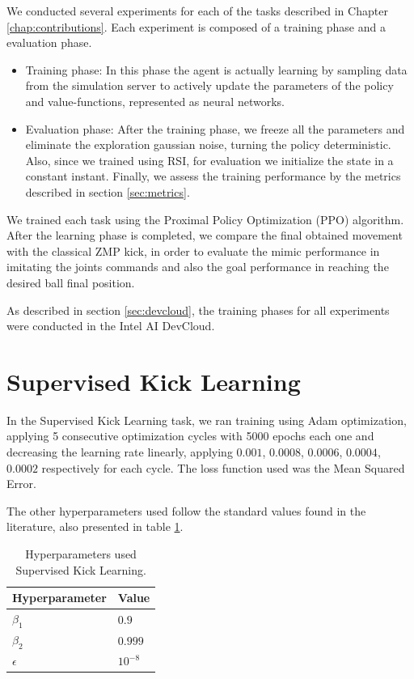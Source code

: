 

We conducted several experiments for each of the tasks described in Chapter \ref{chap:contributions}. Each experiment is composed of a training phase and a evaluation phase.

\begin{itemize}
\item Training phase: In this phase the agent is actually learning by sampling data from the simulation server to actively update the parameters of the policy and value-functions, represented as neural networks.

\item Evaluation phase: After the training phase, we freeze all the parameters and eliminate the exploration gaussian noise, turning the policy deterministic. Also, since we trained using RSI, for evaluation we initialize the state in a constant instant. Finally, we assess the training performance by the metrics described in section \ref{sec:metrics}.
\end{itemize}

We trained each task using the Proximal Policy Optimization (PPO) algorithm. After the learning phase is completed, we compare the final obtained movement with the classical ZMP kick, in order to evaluate the mimic performance in imitating the joints commands and also the goal performance in reaching the desired ball final position.

As described in section \ref{sec:devcloud}, the training phases for all experiments were conducted in the Intel AI DevCloud.

\section{Supervised Kick Learning}

In the Supervised Kick Learning task, we ran training using Adam optimization, applying 5 consecutive optimization cycles with 5000 epochs each one and decreasing the learning rate linearly, applying $0.001$, $0.0008$, $0.0006$, $0.0004$, $0.0002$ respectively for each cycle. The loss function used was the Mean Squared Error.

The other hyperparameters used follow the standard values found in the literature, also presented in table \ref{tab:SL}.

\begin{table}[ht]
    \begin{tabular}{|l|l|}
    \hline
    Hyperparameter            & Value    \\ \hline
    $\beta_1$ 	              & $0.9$ \\
    $\beta_2$                  & $0.999$     \\
    $\epsilon$                & $10^{-8}$     \\
    \hline
    \end{tabular}
\centering
\caption{Hyperparameters used Supervised Kick Learning.}
\label{tab:SL}
\end{table}

